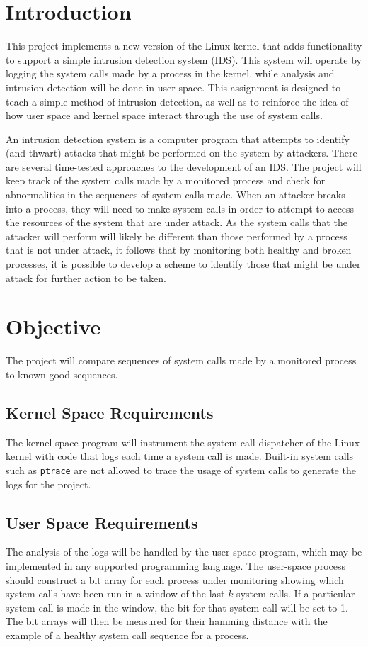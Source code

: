 %
%
%

\section{Introduction} This project implements a new version of the Linux
kernel that adds functionality to support a simple intrusion detection
system (IDS). This system will operate by logging the system calls made by
a process in the kernel, while analysis and intrusion detection will be
done in user space. This assignment is designed to teach a simple method of
intrusion detection, as well as to reinforce the idea of how user space and
kernel space interact through the use of system calls.

An intrusion detection system is a computer program that attempts to
identify (and thwart) attacks that might be performed on the system by
attackers. There are several time-tested approaches to the development of
an IDS. The project will keep track of the system calls made by a monitored
process and check for abnormalities in the sequences of system calls made.
When an attacker breaks into a process, they will need to make system calls
in order to attempt to access the resources of the system that are under
attack. As the system calls that the attacker will perform will likely be
different than those performed by a process that is not under attack, it
follows that by monitoring both healthy and broken processes, it is
possible to develop a scheme to identify those that might be under attack
for further action to be taken.

\section{Objective} The project will compare sequences of system calls made
by a monitored process to known good sequences.

\subsection{Kernel Space Requirements} The kernel-space program will
instrument the system call dispatcher of the Linux kernel with code that
logs each time a system call is made. Built-in system calls such as
\texttt{ptrace} are not allowed to trace the usage of system calls to
generate the logs for the project.

\subsection{User Space Requirements} The analysis of the logs will be
handled by the user-space program, which may be implemented in any
supported programming language. The user-space process should construct a
bit array for each process under monitoring showing which system calls have
been run in a window of the last $k$ system calls. If a particular system
call is made in the window, the bit for that system call will be set to 1.
The bit arrays will then be measured for their hamming distance with the
example of a healthy system call sequence for a process.
